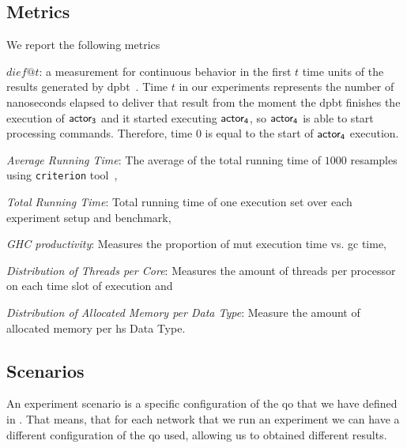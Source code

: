 \subsection{Metrics}\label{sub:metric}
We report the following metrics \begin{inparaenum}[\bf a\upshape)]
      \item {\bf $dief@t$}: a measurement for continuous behavior in the first $t$ time units of the results generated by \acrshort{dpbt}~\cite{diefpaper}. Time $t$ in our experiments represents the number of nanoseconds elapsed to deliver that result from the moment the \acrshort{dpbt} finishes the execution of $\mathsf{actor_3}$ and it started executing $\mathsf{actor_4}$, so $\mathsf{actor_4}$ is able to start processing commands. 
      Therefore, time $0$ is equal to the start of $\mathsf{actor_4}$ execution.
      \item \emph{Average Running Time}: The average of the total running time of $1000$ resamples using \texttt{criterion} tool~\cite{criterion},
      \item \emph{Total Running Time}: Total running time of one execution set over each experiment setup and benchmark,
      \item \emph{GHC productivity}: Measures the proportion of \acrfull{mut} execution time vs. \acrfull{gc} time,
      \item \emph{Distribution of Threads per Core}: Measures the amount of threads per processor on each time slot of execution and
      \item \emph{Distribution of Allocated Memory per Data Type}: Measure the amount of allocated memory per \acrshort{hs} Data Type.
  \end{inparaenum}
    
\subsection{Scenarios}\label{sub:exp:exp-data-setup}
An experiment scenario is a specific configuration of the \acrfull{qo} that we have defined in . 
That means, that for each network that we run an experiment we can have a different configuration of the \acrshort{qo} used, allowing us to obtained different results.

